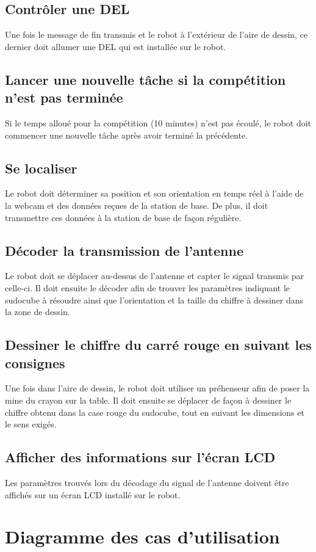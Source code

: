 \subsection{Contrôler une DEL}
Une fois le message de fin transmis et le robot à l'extérieur de l'aire de dessin, ce dernier doit allumer une DEL qui est installée sur le robot.
\subsection{Lancer une nouvelle tâche si la compétition n'est pas terminée}
Si le temps alloué pour la compétition (10 minutes) n'est pas écoulé, le robot doit commencer une nouvelle tâche après avoir terminé la précédente.
\subsection{Se localiser}
Le robot doit déterminer sa position et son orientation en temps réel à l'aide de la webcam et des données reçues de la station de base. De plus, il doit transmettre ces données à la station de base de façon régulière.
\subsection{Décoder la transmission de l'antenne}
Le robot doit se déplacer au-dessus de l'antenne et capter le signal transmis par celle-ci. Il doit ensuite le décoder afin de trouver les paramètres indiquant le sudocube à résoudre ainsi que l'orientation et la taille du chiffre à dessiner dans la zone de dessin.
\subsection{Dessiner le chiffre du carré rouge en suivant les consignes}
Une fois dans l'aire de dessin, le robot doit utiliser un préhenseur afin de poser la mine du crayon sur la table. Il doit ensuite se déplacer de façon à dessiner le chiffre obtenu dans la case rouge du sudocube, tout en suivant les dimensions et le sens exigés. 
\subsection{Afficher des informations sur l'écran LCD}
Les paramètres trouvés lors du décodage du signal de l'antenne doivent être affichés sur un écran LCD installé sur le robot.
\section{Diagramme des cas d'utilisation}
\label{use_cases}
\addtolength{\evensidemargin}{-1in}	
